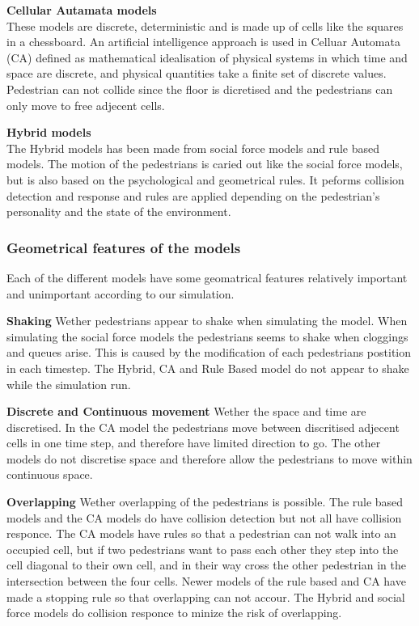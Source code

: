 \textbf{Cellular Autamata models}\\
These models are discrete, deterministic and is made up of cells like the squares in a chessboard.
An artificial intelligence approach is used in Celluar Automata (CA) defined as mathematical idealisation of physical systems in which time and space are
discrete, and physical quantities take a finite set of discrete values. Pedestrian can not collide since the floor is dicretised and the pedestrians can
only move to free adjecent cells.\cite{Comparison}

\textbf{Hybrid models}\\
The Hybrid models has been made from social force models and rule based models. 
The motion of the pedestrians is caried out like the social force models, but is also based 
on the psychological and geometrical rules. It peforms collision detection and response and rules 
are applied depending on the pedestrian's personality and the state of the environment. 
\cite{Comparison}
\\

\subsubsection{Geometrical features of the models}
Each of the different models have some geomatrical features relatively important and 
unimportant according to our simulation.

\textbf{Shaking} Wether pedestrians appear to shake when simulating the model. When 
simulating the social force models the pedestrians seems to shake when cloggings and 
queues arise. This is caused by the modification of each pedestrians postition in each 
timestep. The Hybrid, CA and Rule Based model do not appear to shake while the simulation run.

\textbf{Discrete and Continuous movement} Wether the space and time are discretised. In the CA model the pedestrians move between discritised adjecent
cells in one time step, and therefore have limited direction to go. The other models do not discretise space and therefore allow the pedestrians to move
within continuous space.
 
\textbf{Overlapping} Wether overlapping of the pedestrians is possible. The rule based models and the CA models do have collision detection but not
all have collision responce. The CA models have rules so that a pedestrian can not walk into an occupied cell, but if two pedestrians want to pass each
other they step into the cell diagonal to their own cell, and in their way cross the other pedestrian in the intersection between the four cells.
Newer models of the rule based and CA have made a stopping rule so that overlapping can not accour. The Hybrid and social force models do collision responce
to minize the risk of overlapping. \cite{Comparison}

